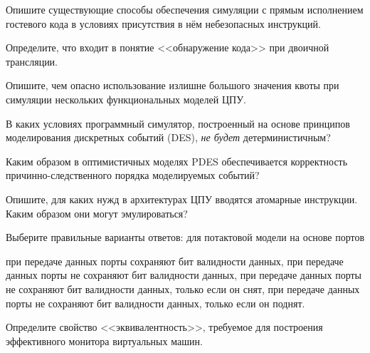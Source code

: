 \documentclass[a4paper, addpoints]{exam}
\begin{document}
\begin{questions}
\question[2] Опишите существующие способы обеспечения симуляции с прямым исполнением гостевого кода в условиях присутствия в нём небезопасных инструкций.
\begin{solution}[2cm]
\end{solution}

\question[2] Определите, что входит в понятие <<обнаружение кода>> при двоичной трансляции.
\begin{solution}[2cm]
\end{solution}


\question[2] Опишите, чем опасно использование излишне большого значения квоты при симуляции нескольких функциональных моделей ЦПУ.
\begin{solution}[2cm]
\end{solution}


\question[2] В каких условиях программный симулятор, построенный на основе принципов моделирования дискретных событий (DES), \emph{не будет} детерминистичным?
\begin{solution}[2cm]
\end{solution}

\question[2] Каким образом в оптимистичных моделях PDES обеспечивается корректность причинно-следственного порядка моделируемых событий?
\begin{solution}[2cm]
\end{solution}

\question[2] Опишите, для каких нужд в архитектурах ЦПУ вводятся атомарные инструкции. Каким образом они могут эмулироваться?
\begin{solution}[2cm]
\end{solution}

\question[1] Выберите правильные варианты ответов: для потактовой модели на основе портов
\begin{choices}
    \correctchoice при передаче данных порты сохраняют бит валидности данных,
    \choice при передаче данных порты не сохраняют бит валидности данных,
    \choice при передаче данных порты не сохраняют бит валидности данных, только если он снят,
    \choice при передаче данных порты не сохраняют бит валидности данных, только если он поднят.
\end{choices}

\question[2] Определите свойство <<эквивалентность>>, требуемое для построения эффективного монитора виртуальных машин.
\begin{solution}[2cm]
\end{solution}


\end{questions}
\end{document}
